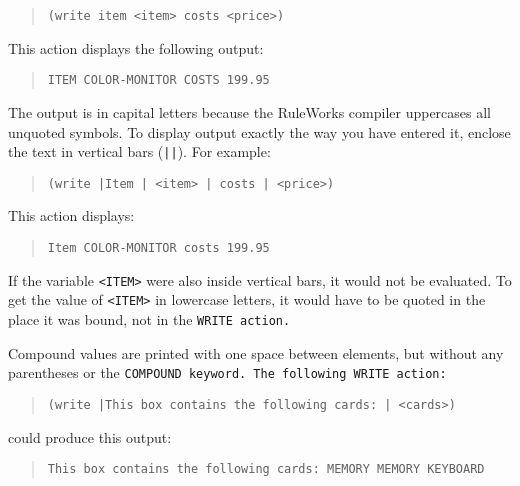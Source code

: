 \begin{quote}
\begin{verbatim}
(write item <item> costs <price>)
\end{verbatim}
\end{quote}

This action displays the following output:

\begin{quote}
\begin{verbatim}
ITEM COLOR-MONITOR COSTS 199.95
\end{verbatim}
\end{quote}

The output is in capital letters because the RuleWorks compiler
uppercases all unquoted symbols. To display output exactly the way you
have entered it, enclose the text in vertical bars (\verb,||,). For
example:

\begin{quote}
\begin{verbatim}
(write |Item | <item> | costs | <price>)
\end{verbatim}
\end{quote}

This action displays:

\begin{quote}
\begin{verbatim}
Item COLOR-MONITOR costs 199.95
\end{verbatim}
\end{quote}

If the variable \verb|<ITEM>| were also inside vertical bars, it would
not be evaluated. To get the value of \verb|<ITEM>| in lowercase
letters, it would have to be quoted in the place it was bound, not in
the \tt{WRITE} action.

Compound values are printed with one space
between elements, but without any parentheses
or the \tt{COMPOUND} keyword. The following \tt{WRITE}
action:

\begin{quote}
\begin{verbatim}
(write |This box contains the following cards: | <cards>)
\end{verbatim}
\end{quote}

could produce this output:

\begin{quote}
\begin{verbatim}
This box contains the following cards: MEMORY MEMORY KEYBOARD
\end{verbatim}
\end{quote}

